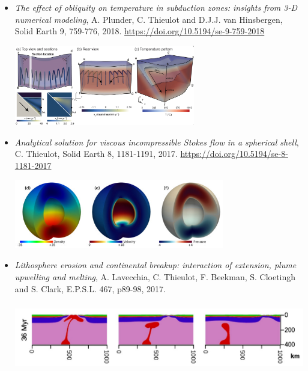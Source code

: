 \begin{itemize}
\item {\it The effect of obliquity on temperature in subduction zones: insights from 3-D numerical modeling}, 
A. Plunder, C. Thieulot and D.J.J. van Hinsbergen, Solid Earth 9, 759-776, 2018. \url{https://doi.org/10.5194/se-9-759-2018}

\begin{center}
\includegraphics[height=3.5cm]{images/mycodes/pltv18_img}
\end{center}


\item {\it Analytical solution for viscous incompressible Stokes flow in a spherical shell}, 
C. Thieulot, Solid Earth 8, 1181-1191, 2017. \url{https://doi.org/10.5194/se-8-1181-2017}

\begin{center}
\includegraphics[height=3cm]{images/mycodes/thie17_img}
\end{center}



\item  {\it Lithosphere erosion and continental breakup: interaction of extension, plume upwelling and melting}, 
A. Lavecchia, C. Thieulot, F. Beekman, S. Cloetingh and S. Clark, E.P.S.L. 467, p89-98, 2017.

\begin{center}
\includegraphics[height=3cm]{images/mycodes/latv17_img}
\end{center}



\end{itemize}

